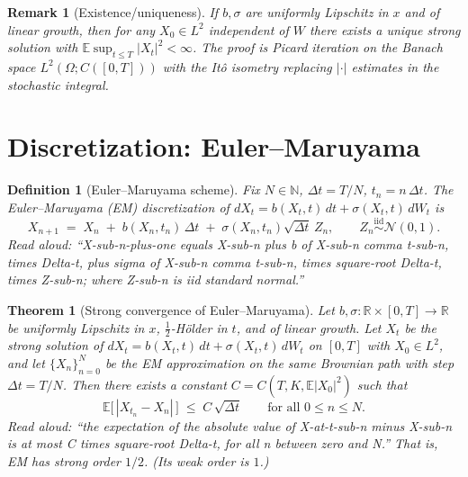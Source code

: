 \documentclass[11pt]{article}
\newtheorem{theorem}{Theorem}
\newtheorem{definition}{Definition}
\newtheorem{remark}{Remark}
\begin{document}
\begin{remark}[Existence/uniqueness]
If $b,\sigma$ are uniformly Lipschitz in $x$ and of linear growth, then for any
$X_0 \in L^2$ independent of $W$ there exists a unique strong solution with
$\mathbb{E}\sup_{t\le T}|X_t|^2 < \infty$. The proof is Picard iteration on the Banach
space $L^2(\Omega; C([0,T]))$ with the It\^o isometry replacing $|\cdot|$
estimates in the stochastic integral.
\end{remark}

\section{Discretization: Euler--Maruyama}

\begin{definition}[Euler--Maruyama scheme]
Fix $N\in\mathbb{N}$, $\Delta t = T/N$, $t_n = n\,\Delta t$. The
\emph{Euler--Maruyama} (EM) discretization of $dX_t = b(X_t,t)\,dt + \sigma(X_t,t)\,dW_t$ is
\[
X_{n+1} \;=\; X_n \;+\; b(X_n, t_n)\,\Delta t \;+\; \sigma(X_n, t_n)\sqrt{\Delta t}\,Z_n,
\qquad Z_n \stackrel{\text{iid}}{\sim} \mathcal{N}(0,1).
\]
\emph{Read aloud:} ``X-sub-n-plus-one equals X-sub-n plus b of X-sub-n comma t-sub-n, times Delta-t, plus sigma of X-sub-n comma t-sub-n, times square-root Delta-t, times Z-sub-n; where Z-sub-n is iid standard normal.''
\end{definition}

\begin{theorem}[Strong convergence of Euler--Maruyama]
\label{thm:em}
Let $b,\sigma:\mathbb{R}\times[0,T]\to\mathbb{R}$ be uniformly Lipschitz in $x$, $\tfrac{1}{2}$-H\"older
in $t$, and of linear growth. Let $X_t$ be the strong solution of
$dX_t = b(X_t,t)\,dt + \sigma(X_t,t)\,dW_t$ on $[0,T]$ with $X_0 \in L^2$, and let
$\{X_n\}_{n=0}^N$ be the EM approximation on the same Brownian path with step
$\Delta t = T/N$. Then there exists a constant $C = C(T, K, \mathbb{E}|X_0|^2)$ such that
\[
\mathbb{E}\bigl[\,|X_{t_n} - X_n|\,\bigr] \;\le\; C\,\sqrt{\Delta t}
\qquad \text{for all } 0 \le n \le N.
\]
\emph{Read aloud:} ``the expectation of the absolute value of X-at-t-sub-n minus X-sub-n is at most C times square-root Delta-t, for all n between zero and N.''
That is, EM has \emph{strong order} $1/2$. (Its \emph{weak order} is $1$.)
\end{theorem}
\end{document}

